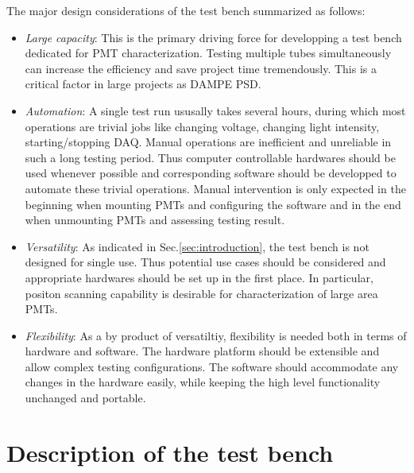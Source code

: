 \documentclass[5p, times]{elsarticle}
\begin{document}
The major design considerations of the test bench summarized as follows:
\begin{itemize}
 \item \textit{Large capacity}: This is the primary driving force for developping a test bench dedicated for PMT characterization.
 Testing multiple tubes simultaneously can increase the efficiency and save project time tremendously.
 This is a critical factor in large projects as DAMPE PSD.
 \item \textit{Automation}: A single test run ususally takes several hours, during which most operations are trivial jobs like changing voltage, changing light intensity, starting/stopping DAQ.
 Manual operations are inefficient and unreliable in such a long testing period.
 Thus computer controllable hardwares should be used whenever possible and corresponding software should be developped to automate these trivial operations.
 Manual intervention is only expected in the beginning when mounting PMTs and configuring the software and in the end when unmounting PMTs and assessing testing result. 
 \item \textit{Versatility}: As indicated in Sec.\ref{sec:introduction}, the test bench is not designed for single use.
 T\-h\-u\-s potential use cases should be considered and appropriate hardwares should be set up in the first place.
 In particular, positon scanning capability is desirable for characterization of large area PMTs. 
 \item \textit{Flexibility}: As a by product of versatiltiy, flexibility is needed both in terms of hardware and software.
 The hardware platform should be extensible and allow complex testing configurations.
 The software should accommodate any changes in the hardware easily, while keeping the high level functionality unchanged and portable. 
\end{itemize}

\section{Description of the test bench}
\label{sec:description}
\end{document}
